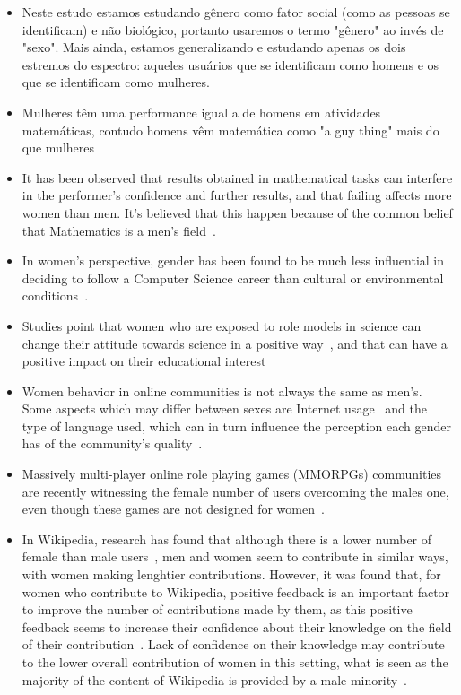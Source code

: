 \begin{itemize}
	\item Neste estudo estamos estudando gênero como fator social (como as pessoas se identificam) e não biológico, portanto usaremos o termo "gênero" ao invés de "sexo". Mais ainda, estamos generalizando e estudando apenas os dois estremos do espectro: aqueles usuários que se identificam como homens e os que se identificam como mulheres.
	\item Mulheres têm uma performance igual a de homens em atividades matemáticas, contudo homens vêm matemática como "a guy thing" mais do que mulheres~\cite{hyde1990gender}
	\item It has been observed that results obtained in mathematical tasks can interfere in the performer's confidence and further results, and that failing affects more women than men. It's believed that this happen because of the common belief that Mathematics is a men's field~\cite{campbell1986effects}.
	\item In women's perspective, gender has been found to be much less influential in deciding to follow a Computer Science career than cultural or environmental conditions~\cite{blum2007cultural}.
	\item Studies point that women who are exposed to role models in science can change their attitude towards science in a positive way~\cite{smith1986effect}, and that can have a positive impact on their educational interest~\cite{nixon1999educational}
	\item Women behavior in online communities is not always the same as men's. Some aspects which may differ between sexes are Internet usage~\cite{hargittai2006differences} and the type of language used, which can in turn influence the perception each gender has of the community's quality~\cite{Gefen:2005:YSS:1066149.1066156}. 
	\item Massively multi-player online role playing games (MMORPGs) communities are recently witnessing the female number of users overcoming the males one, even though these games are not designed for women~\cite{taylor2003multiple}. 
	\item In Wikipedia, research has found that although there is a lower number of female than male users~\cite{glott2010wikipedia}, men and women seem to contribute in similar ways, with women making lenghtier contributions. However, it was found that, for women who contribute to Wikipedia, positive feedback is an important factor to improve the number of contributions made by them, as this positive feedback seems to increase their confidence about their knowledge on the field of their contribution~\cite{collier2012conflict}. Lack of confidence on their knowledge may contribute to the lower overall contribution of women in this setting, what is seen as the majority of the content of Wikipedia is provided by a male minority~\cite{antin2011gender,lam2011wp}.

\end{itemize}
